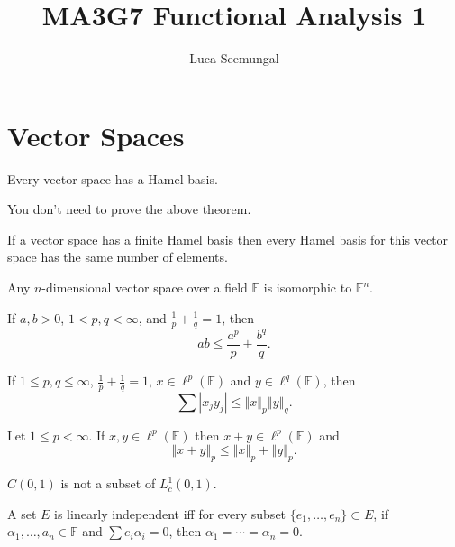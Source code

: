 \documentclass[a4paper]{article}
\title{MA3G7 Functional Analysis 1}
\author{Luca Seemungal}
\newcommand{\F}{\mathbb{F}}
\newcommand{\norm}[1]{\left\Vert #1 \right\Vert}
\newcommand{\oneover}[1]{\frac{1}{#1}}
\newcommand{\<}{\langle}
\renewcommand{\>}{\rangle}
\renewcommand{\a}{\alpha}
\begin{document}
\maketitle
\tableofcontents

\section{Vector Spaces}

\begin{thm}
  Every vector space has a Hamel basis.
\end{thm}

You don't need to prove the above theorem.

\begin{thm}
  If a vector space has a finite Hamel basis then every Hamel basis for this vector space has the same number of elements.
\end{thm}

\begin{prop}
  Any $n$-dimensional vector space over a field $\F$ is isomorphic to $\F^n$.
\end{prop}

\begin{lemma}
  If $a,b>0$, $1<p,q<\infty$, and $\frac{1}{p} + \frac{1}{q} = 1$, then
  $$ ab \leq \frac{a^p}{p} + \frac{b^q}{q}.$$
\end{lemma}

\begin{lemma}
  If $1\leq p,q\leq\infty$, $\oneover{p} + \oneover{q} = 1$, $x\in\ell^p(\F)$ and $y\in\ell^q(\F)$, then
  $$\sum |x_jy_j| \leq \norm{x}_p\norm{y}_q.$$
\end{lemma}

\begin{lemma}
  Let $1\leq p<\infty$. If $x,y\in\ell^p(\F)$ then $x+y\in\ell^p(\F)$ and
  $$\norm{x+y}_p \leq \norm{x}_p + \norm{y}_p.$$
\end{lemma}

\begin{ex}
  $C(0,1)$ is not a subset of $L_c^1(0,1)$.
\end{ex}

\begin{ex}
  A set $E$ is linearly independent iff for every subset $\{e_1,\ldots,e_n\}\subset E$, if $\a_1,\ldots,a_n\in\F$ and $\sum e_i\a_i = 0$, then $\a_1 = \cdots = \a_n = 0$.
\end{ex}
\end{document}
